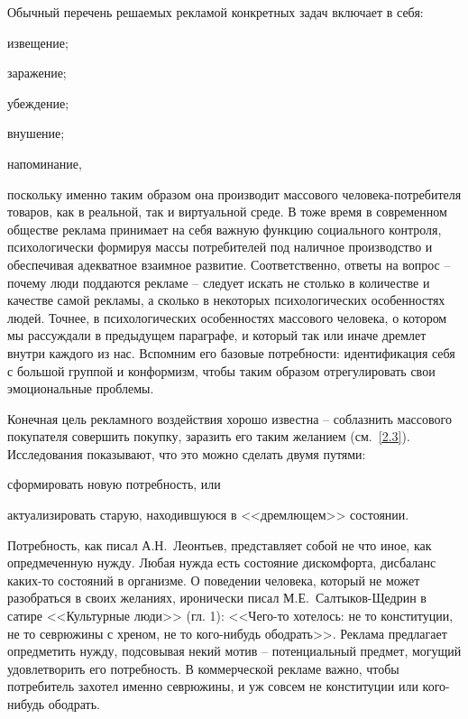 Обычный перечень решаемых рекламой конкретных задач включает в себя:
\begin{enumerate*}[label=\asbuk*)]
\item извещение;
\item заражение;
\item убеждение;
\item внушение;
\item напоминание,
\end{enumerate*}
поскольку именно таким образом она производит массового
человека-потребителя товаров, как в реальной, так и виртуальной среде.
В тоже время в современном обществе реклама принимает на себя важную
функцию социального контроля, психологически формируя массы
потребителей под наличное производство и обеспечивая адекватное взаимное
развитие.\autocite{feofanov1987} Соответственно, ответы на вопрос -- почему люди поддаются рекламе --
следует искать не столько в количестве и качестве самой рекламы,
а сколько в некоторых психологических особенностях людей. Точнее, в
психологических особенностях массового человека, о котором мы рассуждали в
предыдущем параграфе, и который так или иначе дремлет внутри каждого из нас.
Вспомним его базовые потребности: идентификация себя с большой группой и
конформизм, чтобы таким образом отрегулировать свои эмоциональные проблемы.

Конечная цель рекламного воздействия хорошо известна -- соблазнить массового
покупателя совершить покупку, заразить его таким желанием (см.~\ref{2.3}).
Исследования показывают, что это можно сделать двумя путями:
\begin{enumerate*}[label=\asbuk*)]
    \item сформировать новую потребность, или
    \item актуализировать старую, находившуюся в <<дремлющем>> состоянии.
\end{enumerate*}
Потребность, как писал А.Н.~Леонтьев, представляет собой не что иное,
как опредмеченную нужду.\autocite{leontev2012}
Любая нужда есть состояние дискомфорта, дисбаланс каких-то состояний в организме.
О поведении человека, который не может разобраться в своих желаниях,
иронически писал М.Е.~Салтыков-Щедрин в сатире <<Культурные люди>> (гл. 1):
<<Чего-то хотелось: не то конституции, не то севрюжины с хреном, не то кого-нибудь
ободрать>>.\autocite{saltikov2000} Реклама предлагает опредметить нужду,
подсовывая некий мотив -- потенциальный предмет, могущий удовлетворить его
потребность. В коммерческой рекламе важно, чтобы потребитель захотел именно
севрюжины, и уж совсем не конституции или кого-нибудь ободрать.

